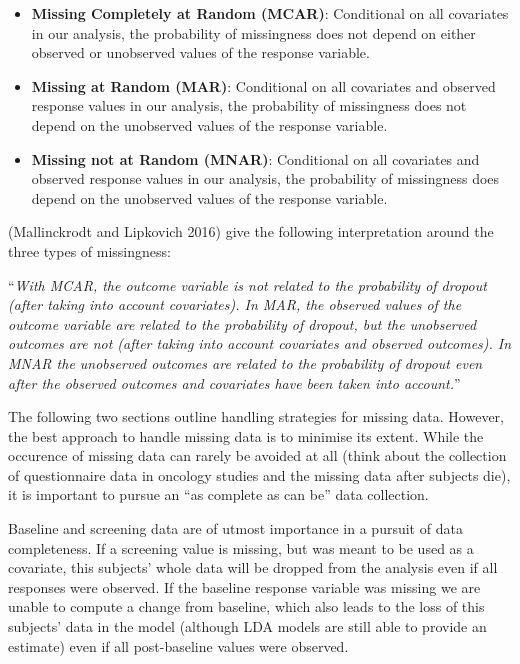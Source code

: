 \documentclass[
  letterpaper,
  DIV=11,
  numbers=noendperiod]{scrreprt}
\begin{document}
\begin{itemize}
\item
  \textbf{Missing Completely at Random (MCAR)}: Conditional on all
  covariates in our analysis, the probability of missingness does not
  depend on either observed or unobserved values of the response
  variable.
\item
  \textbf{Missing at Random (MAR)}: Conditional on all covariates and
  observed response values in our analysis, the probability of
  missingness does not depend on the unobserved values of the response
  variable.
\item
  \textbf{Missing not at Random (MNAR)}: Conditional on all covariates
  and observed response values in our analysis, the probability of
  missingness does depend on the unobserved values of the response
  variable.
\end{itemize}

(Mallinckrodt and Lipkovich 2016) give the following interpretation
around the three types of missingness:

``\emph{With MCAR, the outcome variable is not related to the
probability of dropout (after taking into account covariates). In MAR,
the observed values of the outcome variable are related to the
probability of dropout, but the unobserved outcomes are not (after
taking into account covariates and observed outcomes). In MNAR the
unobserved outcomes are related to the probability of dropout even after
the observed outcomes and covariates have been taken into account.}''

The following two sections outline handling strategies for missing data.
However, the best approach to handle missing data is to minimise its
extent. While the occurence of missing data can rarely be avoided at all
(think about the collection of questionnaire data in oncology studies
and the missing data after subjects die), it is important to pursue an
``as complete as can be'' data collection.

Baseline and screening data are of utmost importance in a pursuit of
data completeness. If a screening value is missing, but was meant to be
used as a covariate, this subjects' whole data will be dropped from the
analysis even if all responses were observed. If the baseline response
variable was missing we are unable to compute a change from baseline,
which also leads to the loss of this subjects' data in the model
(although LDA models are still able to provide an estimate) even if all
post-baseline values were observed.
\end{document}
